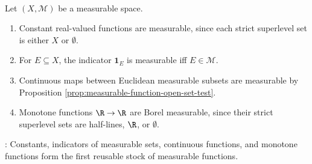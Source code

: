 \begin{example} \label{ex:basic-measurable-functions} \\
Let $(X,\mathcal{M})$ be a measurable space.
\begin{enumerate}[label=(\roman*)]
\setlength{\itemsep}{0pt}
\item Constant real-valued functions are measurable, since each strict superlevel set is either $X$ or $\emptyset$.
\item For $E\subseteq X$, the indicator $\mathbf{1}_E$ is measurable iff $E\in\mathcal{M}$.
\item Continuous maps between Euclidean measurable subsets are measurable by Proposition \ref{prop:measurable-function-open-set-test}.
\item Monotone functions $\R\to\R$ are Borel measurable, since their strict superlevel sets are half-lines, $\R$, or $\emptyset$.
\end{enumerate}
: Constants, indicators of measurable sets, continuous functions, and monotone functions form the first reusable stock of measurable functions.
\end{example}

